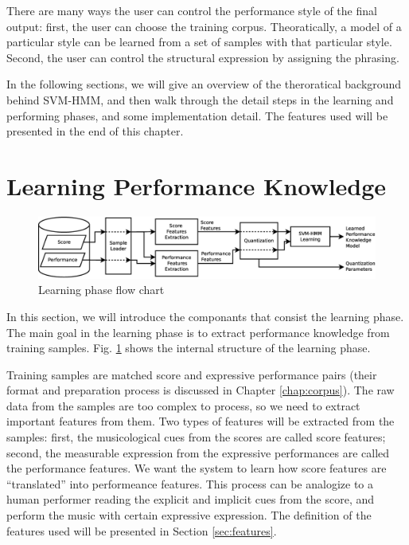 There are many ways the user can control the performance style of the final output: first, the user can choose the training corpus. Theoratically, a model of a particular style can be learned from a set of samples with that particular style. Second, the user can control the structural expression by assigning the phrasing.


In the following sections, we will give an overview of the theroratical background behind SVM-HMM, and then walk through the detail steps in the learning and performing phases, and some implementation detail. The features used will be presented in the end of this chapter.



\section{Learning Performance Knowledge}
\label{sec:learn}
\begin{figure}[tp]
   \begin{center}
      \includegraphics[width=\textwidth]{fig/learn_arch}
   \end{center}
   \caption{Learning phase flow chart} 
   \label{fig:learnflow}
\end{figure}
In this section, we will introduce the componants that consist the learning phase.
The main goal in the learning phase is to extract performance knowledge from training samples. Fig. \ref{fig:learnflow} shows the internal structure of the learning phase.

Training samples are matched score and expressive performance pairs (their format and preparation process is discussed in Chapter \ref{chap:corpus}). The raw data from the samples are too complex to process, so we need to extract important features from them. Two types of features will be extracted from the samples: first, the musicological cues from the scores are called score features; second, the measurable expression from the expressive performances are called the performance features. We want the system to learn how score features are \enquote{translated} into performeance features. This process can be analogize to a human performer reading the explicit and implicit cues from the score, and perform the music with certain expressive expression. The definition of the features used will be presented in Section \ref{sec:features}.


